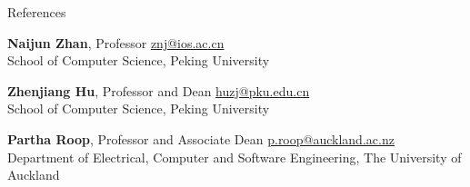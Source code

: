 \documentclass[
	10pt, %
]{resume} %
\begin{document}






\begin{rSection}{References}
	\item \textbf{Naijun Zhan}, Professor \hfill \href{mailto:znj@ios.ac.cn}{znj@ios.ac.cn} \\
	School of Computer Science, Peking University
	
	\item \textbf{Zhenjiang Hu}, Professor and Dean \hfill \href{mailto:huzj@pku.edu.cn}{huzj@pku.edu.cn} \\
	School of Computer Science, Peking University
	
	\item \textbf{Partha Roop}, Professor and Associate Dean \hfill \href{mailto:p.roop@auckland.ac.nz}{p.roop@auckland.ac.nz} \\
	Department of Electrical, Computer and Software Engineering, The University of Auckland
\end{rSection}

\end{document}
